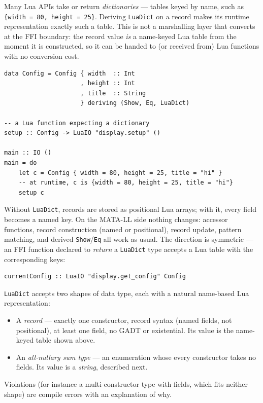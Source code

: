 \documentclass[11pt,a4paper]{article}
\begin{document}
Many Lua APIs take or return \emph{dictionaries} --- tables keyed by
name, such as \texttt{\{width = 80, height = 25\}}.  Deriving
\texttt{LuaDict} on a record makes its runtime representation exactly
such a table.  This is not a marshalling layer that converts at the FFI
boundary: the record value \emph{is} a name-keyed Lua table from the
moment it is constructed, so it can be handed to (or received from) Lua
functions with no conversion cost.

\begin{lstlisting}
data Config = Config { width  :: Int
                     , height :: Int
                     , title  :: String
                     } deriving (Show, Eq, LuaDict)

-- a Lua function expecting a dictionary
setup :: Config -> LuaIO "display.setup" ()

main :: IO ()
main = do
    let c = Config { width = 80, height = 25, title = "hi" }
    -- at runtime, c is {width = 80, height = 25, title = "hi"}
    setup c
\end{lstlisting}

Without \texttt{LuaDict}, records are stored as positional Lua arrays;
with it, every field becomes a named key.  On the MATA-LL side nothing
changes: accessor functions, record construction (named or positional),
record update, pattern matching, and derived \texttt{Show}/\texttt{Eq}
all work as usual.  The direction is symmetric --- an FFI function
declared to \emph{return} a \texttt{LuaDict} type accepts a Lua table
with the corresponding keys:

\begin{lstlisting}
currentConfig :: LuaIO "display.get_config" Config
\end{lstlisting}

\texttt{LuaDict} accepts two shapes of data type, each with a natural
name-based Lua representation:

\begin{itemize}[nosep]
  \item A \emph{record} --- exactly one constructor, record syntax
        (named fields, not positional), at least one field, no GADT or
        existential.  Its value is the name-keyed table shown above.
  \item An \emph{all-nullary sum type} --- an enumeration whose every
        constructor takes no fields.  Its value is a \emph{string},
        described next.
\end{itemize}

Violations (for instance a multi-constructor type with fields, which
fits neither shape) are compile errors with an explanation of why.
\end{document}
